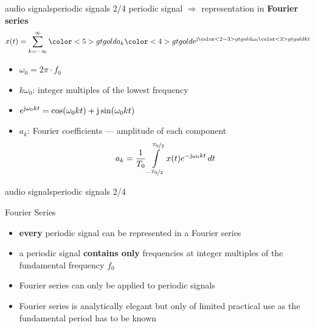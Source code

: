         \begin{frame}{audio signals}{periodic signals 2/4}
            periodic signal $\Rightarrow$ representation in \textbf{Fourier series}
            \begin {equation}
                x(t) = \sum\limits_{k=-\infty}^{\infty} {\color<5>{gtgold}{a_k}} {\color<4>{gtgold}{\e^{\mathrm{j}{\color<2-3>{gtgold}{\omega_0}} {\color<3>{gtgold}{k}} t}}} \nonumber
            \end {equation}
            \begin{itemize}
                \item<2-> $\omega_0 = 2\pi\cdot f_0$
                \item<3-> $k\omega_0$: integer multiples of the lowest frequency
                \item<4-> ${e}^{\mathrm{j}\omega_0kt} = \cos(\omega_0kt) + \mathrm{j} \sin(\omega_0kt)$
                \item<5-> $a_k$: Fourier coefficients --- amplitude of each component
                    \begin {equation}\label{eq:fourier_coeff}
                        a_k = \frac{1}{T_0}\int\limits_{-\nicefrac{T_0}{2}}^{\nicefrac{T_0}{2}} x(t) {e}^{-\mathrm{j}\omega_0kt}\, dt \nonumber
                    \end {equation}
            \end{itemize}
        \end{frame}

        \begin{frame}{audio signals}{periodic signals 2/4}
            \toremember{}
            
            \begin{block}{Fourier Series}
                \begin{itemize}
                    \item   \textbf{every} periodic signal can be represented in a Fourier series
                    \item   a periodic signal \textbf{contains only} frequencies at integer multiples of the fundamental frequency $f_0$
                    \bigskip
                    \item<2->   Fourier series can only be applied to periodic signals
                    \item<2->   Fourier series is analytically elegant but only of limited practical use as the fundamental period has to be known
                \end{itemize}
            \end{block}
        \end{frame}

